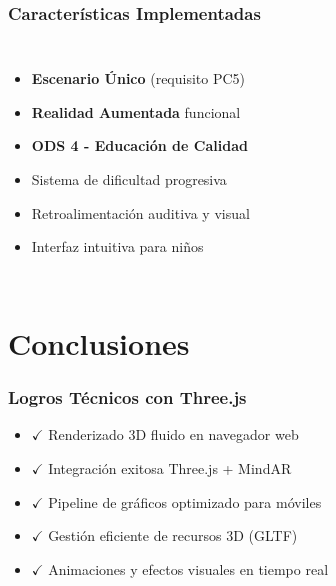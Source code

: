 \documentclass{beamer}
\begin{document}
\begin{frame}
\frametitle{Características Implementadas}
\begin{columns}
\begin{itemize}
    \item<1-> \textbf{Escenario Único} (requisito PC5)
    \item<2-> \textbf{Realidad Aumentada} funcional
    \item<3-> \textbf{ODS 4 - Educación de Calidad}
    \item<4-> Sistema de dificultad progresiva
    \item<5-> Retroalimentación auditiva y visual
    \item<6-> Interfaz intuitiva para niños
\end{itemize}

\end{columns}
\end{frame}

\section{Conclusiones}

\begin{frame}
\frametitle{Logros Técnicos con Three.js}
\begin{itemize}
    \item<1-> $\checkmark$ Renderizado 3D fluido en navegador web
    \item<2-> $\checkmark$ Integración exitosa Three.js + MindAR
    \item<3-> $\checkmark$ Pipeline de gráficos optimizado para móviles
    \item<4-> $\checkmark$ Gestión eficiente de recursos 3D (GLTF)
    \item<5-> $\checkmark$ Animaciones y efectos visuales en tiempo real
\end{itemize}

\end{frame}
\end{document}
